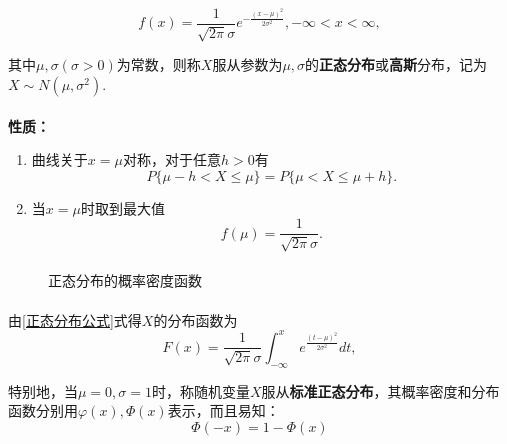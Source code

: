 \begin{equation}
  \label{正态分布公式}
  f(x) = \frac{1}{\sqrt{2\pi}\sigma}e^{-\frac{(x-\mu)^2}{2\sigma^2}}, -\infty < x < \infty,
\end{equation}

其中$\mu, \sigma(\sigma > 0)$为常数，则称$X$服从参数为$\mu, \sigma$的\textbf{正态分布}或\textbf{高斯}分布，记为$X\sim N(\mu, \sigma^2)$.

\paragraph{}
\textbf{性质：}
\begin{enumerate}
  \item 曲线关于$x=\mu$对称，对于任意$h > 0$有
  \begin{equation}
    P\{\mu-h < X \leq \mu\} = P\{\mu < X \leq \mu+h\}.
  \end{equation}
  \item 当$x=\mu$时取到最大值
  \begin{equation}
    f(\mu) = \frac{1}{\sqrt{2\pi}\sigma}.
  \end{equation}
\end{enumerate}

\paragraph{}
\begin{figure}[H]
\centering
  \begin{subfigure}[t]{0.48\linewidth}
    \centering
      
  \end{subfigure}
  \begin{subfigure}[t]{0.48\linewidth}
    \centering
      
  \end{subfigure}
  \caption{正态分布的概率密度函数}
  \label{正态分布的概率密度函数}
\end{figure}

\paragraph{}
由\eqref{正态分布公式}式得$X$的分布函数为
\begin{equation}
  F(x) = \frac{1}{\sqrt{2\pi}\sigma}\int_{-\infty}^x e^{\frac{(t-\mu)^2}{2\sigma^2}}dt,
\end{equation}

特别地，当$\mu=0, \sigma=1$时，称随机变量$X$服从\textbf{标准正态分布}，其概率密度和分布函数分别用$\varphi(x), \Phi(x)$表示，而且易知：
\begin{equation}
  \Phi(-x) = 1 - \Phi(x)
\end{equation}

